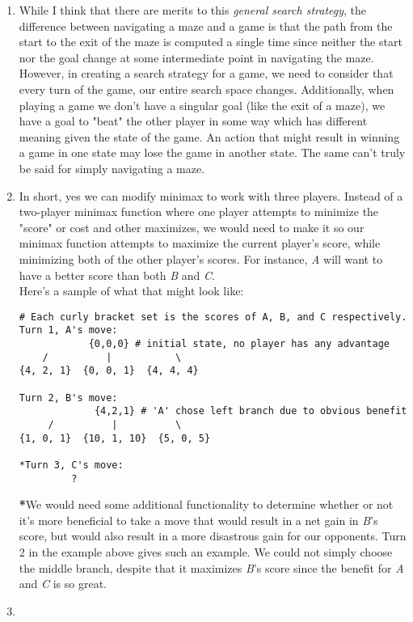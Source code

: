 \documentclass{article}
\begin{document}
\begin{enumerate}
    \item %
    While I think that there are merits to this \textit{general search strategy}, the difference between navigating a maze and a game is that the path from the start to the exit of the maze is computed a single time since neither the start nor the goal change at some intermediate point in navigating the maze. However, in creating a search strategy for a game, we need to consider that every turn of the game, our entire search space changes. Additionally, when playing a game we don't have a singular goal (like the exit of a maze), we have a goal to "beat" the other player in some way which has different meaning given the state of the game. An action that might result in winning a game in one state may lose the game in another state. The same can't truly be said for simply navigating a maze.

    \item
    In short, yes we can modify minimax to work with three players. Instead of a two-player minimax function where one player attempts to minimize the "score" or cost and other maximizes, we would need to make it so our minimax function attempts to maximize the current player's score, while minimizing both of the other player's scores. For instance, \textit{A} will want to have a better score than both \textit{B} and \textit{C}.
    \\Here's a sample of what that might look like:
\begin{verbatim}
# Each curly bracket set is the scores of A, B, and C respectively.
Turn 1, A's move:
            {0,0,0} # initial state, no player has any advantage
    /          |           \
{4, 2, 1}  {0, 0, 1}  {4, 4, 4}

Turn 2, B's move:
             {4,2,1} # 'A' chose left branch due to obvious benefit
     /          |          \
{1, 0, 1}  {10, 1, 10}  {5, 0, 5}

*Turn 3, C's move:
         ? 
\end{verbatim}

    \textbf{*}We would need some additional functionality to determine whether or not it's more beneficial to take a move that would result in a net gain in \textit{B}'s score, but would also result in a more disastrous gain for our opponents. Turn 2 in the example above gives such an example. We could not simply choose the middle branch, despite that it maximizes \textit{B}'s score since the benefit for \textit{A} and \textit{C} is so great.

    \item


\end{enumerate}
\end{document}
